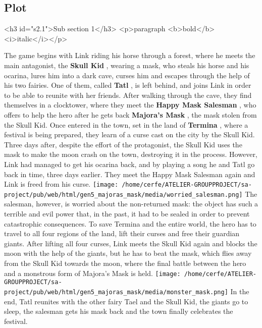 \documentclass[a4paper,10pt]{book}
\begin{document}
 \subsection{Plot }
 <h3 id="s2.1">Sub section 1</h3>
        <p>paragraph <b>bold</b> <i>italic</i></p> 
 
          The game begins with Link riding his horse through a forest, where he meets the main antagonist, the  \textbf{Skull Kid } , wearing a mask, who steals his horse and his ocarina, lures him into a dark cave,
          curses him and escapes through the help of his two fairies. One of them, called  \textbf{Tatl } , is left behind, and joins Link in order to be able to reunite with her friends. After walking through the
          cave, they find themselves in a clocktower, where they meet the  \textbf{Happy Mask Salesman } , who offers to help the hero after he gets back  \textbf{Majora's Mask } , the mask stolen from the Skull Kid. 
          Once entered in the town, set in the land of  \textbf{Termina } , where a festival is being prepared, they learn of a curse cast on the city by the Skull Kid. Three days after, despite the effort
          of the protagonist, the Skull Kid uses the mask to make the moon crash on the town, destroying it in the process. However, Link had managed to get his ocarina back, and by playing a song he and Tatl go
          back in time, three days earlier. They meet the Happy Mask Salesman again and Link is freed from his curse. 
 \texttt{[image: /home/cerfe/ATELIER-GROUPPROJECT/sa-project/pub/web/html/gen5\_majoras\_mask/media/worried\_salesman.png]}
          The salesman, however, is worried about the non-returned mask: the object has such a terrible
          and evil power that, in the past, it had to be sealed in order to prevent catastrophic consequences.
          To save Termina and the entire world, the hero has to travel to all four regions of the land, lift their curses and free their guardian giants. After lifting all four curses, Link meets the Skull Kid
          again and blocks the moon with the help of the giants, but he has to beat the mask, which flies away from the Skull Kid towards the moon, where the final battle between the hero and a monstrous form of
          Majora's Mask is held. 
 \texttt{[image: /home/cerfe/ATELIER-GROUPPROJECT/sa-project/pub/web/html/gen5\_majoras\_mask/media/monster\_mask.png]}
          In the end, Tatl reunites with the other fairy Tael and the Skull Kid, the giants go to sleep, the salesman gets his mask back and the town finally celebrates the festival.
         
\end{document}
